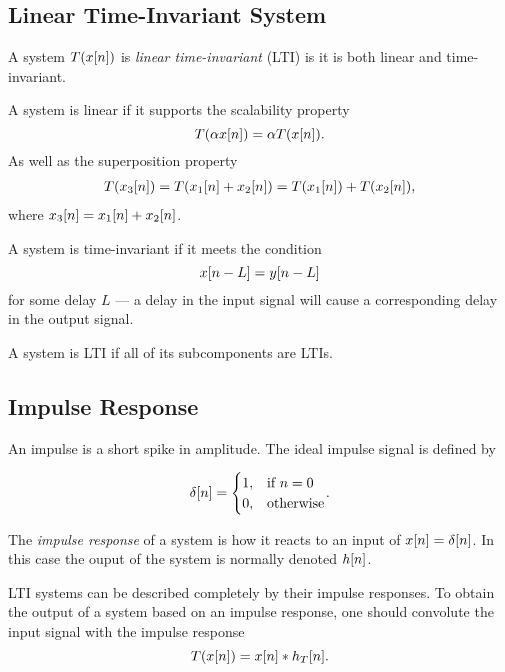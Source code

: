 \documentclass[11pt]{article}
\let\originalleft\left
\let\originalright\right
\renewcommand{\left}{\mathopen{}\mathclose\bgroup\originalleft}
\renewcommand{\right}{\aftergroup\egroup\originalright}
\def\lsqb{\left[}
\def\rsqb{\right]}
\def\sqb#1{\lsqb #1 \rsqb}
\def\xsig{x\sqb{n}}
\begin{document}
\subsection{Linear Time-Invariant System}

A system $T(x\sqb{n})$ is \textit{linear time-invariant} (LTI) is it is both linear and time-invariant.

A system is linear if it supports the scalability property 
\begin{equation}
    T(\alpha \xsig) = \alpha T(\xsig).
\end{equation}
As well as the superposition property 
\begin{gather}
    T(x_3\sqb{n}) = T(x_1\sqb{n} + x_2\sqb{n}) =  T(x_1\sqb{n}) + T(x_2\sqb{n}), 
\end{gather}
where $x_3\sqb{n} = x_1\sqb{n} + x_2\sqb{n}$.

A system is time-invariant if it meets the condition
\begin{equation}
    x\sqb{n - L} = y\sqb{n - L}
\end{equation}
for some delay $L$ --- a delay in the input signal will cause a corresponding delay in the output signal.

A system is LTI if all of its subcomponents are LTIs.

\subsection{Impulse Response}
An impulse is a short spike in amplitude. The ideal impulse signal is defined by

\begin{equation}
    \delta\sqb{n} =
        \begin{cases}
            1, & \text{if } n = 0 \\
            0, & \text{otherwise}
        \end{cases}.
\end{equation}

The \textit{impulse response} of a system is how it reacts to an input of $\xsig = \delta\sqb{n}$. In this
case the ouput of the system is normally denoted $h\sqb{n}$.

LTI systems can be described completely by their impulse responses. To obtain the output of a system based on an impulse response, one should convolute the input signal with the impulse response
\begin{equation}
    T(\xsig) = \xsig * h_T\sqb{n}.
\end{equation}
\end{document}
